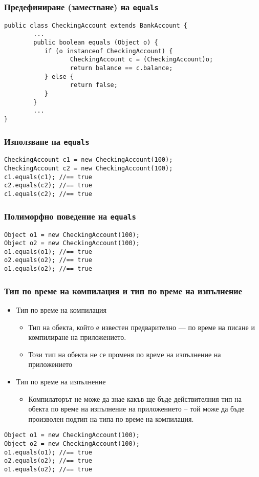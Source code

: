 \documentclass[ignorenonframetext, hyperref=unicode,compress]{beamer}
\begin{document}
\begin{frame}[containsverbatim]\frametitle{Предефиниране (заместване) на \lstinline{equals}}
\begin{lstlisting}
public class CheckingAccount extends BankAccount {
        ...
        public boolean equals (Object o) {
           if (o instanceof CheckingAccount) {
                  CheckingAccount c = (CheckingAccount)o;
                  return balance == c.balance;
           } else {
                  return false;
           }
        }
        ...
}
\end{lstlisting}
\end{frame}

\begin{frame}[containsverbatim]\frametitle{Използване на \lstinline{equals}}
\begin{lstlisting}
CheckingAccount c1 = new CheckingAccount(100);
CheckingAccount c2 = new CheckingAccount(100);
c1.equals(c1); //== true
c2.equals(c2); //== true
c1.equals(c2); //== true
\end{lstlisting}
\end{frame}

\begin{frame}[containsverbatim]\frametitle{Полиморфно поведение на \lstinline{equals}}
\begin{lstlisting}
Object o1 = new CheckingAccount(100);
Object o2 = new CheckingAccount(100);
o1.equals(o1); //== true
o2.equals(o2); //== true
o1.equals(o2); //== true
\end{lstlisting}
\end{frame}

\begin{frame}[containsverbatim]\frametitle{Тип по време на компилация и тип по време на изпълнение}
\begin{itemize}
 \item Тип по време на компилация
\begin{itemize}
 \item Тип на обекта, който е известен предварително --- по време на писане и компилиране на приложението.
 \item Този тип на обекта не се променя по време на изпълнение на приложението
\end{itemize}
 \item Тип по време на изпълнение
\begin{itemize}
 \item Компилаторът не може да знае какъв ще бъде действителния тип на обекта по време на изпълнение на приложението -- той може да бъде произволен подтип на типа по време на компилация.
\end{itemize}
\end{itemize}
\begin{lstlisting}
Object o1 = new CheckingAccount(100);
Object o2 = new CheckingAccount(100);
o1.equals(o1); //== true
o2.equals(o2); //== true
o1.equals(o2); //== true
\end{lstlisting}
\end{frame}
\end{document}
